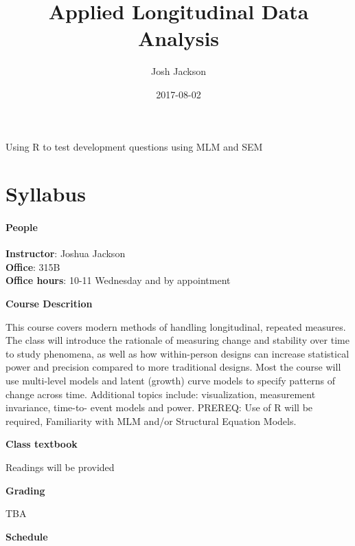 \documentclass[]{book}
\title{Applied Longitudinal Data Analysis}
\author{Josh Jackson}
\date{2017-08-02}
\begin{document}
\maketitle

{
\setcounter{tocdepth}{1}
\tableofcontents
}
\chapter*{}\label{section}

Using R to test development questions using MLM and SEM

\chapter{Syllabus}\label{syllabus}

\subsubsection{People}\label{people}

\textbf{Instructor}: Joshua Jackson\\
\textbf{Office}: 315B\\
\textbf{Office hours}: 10-11 Wednesday and by appointment

\textbf{Course Descrition}

This course covers modern methods of handling longitudinal, repeated
measures. The class will introduce the rationale of measuring change and
stability over time to study phenomena, as well as how within-person
designs can increase statistical power and precision compared to more
traditional designs. Most the course will use multi-level models and
latent (growth) curve models to specify patterns of change across time.
Additional topics include: visualization, measurement invariance,
time-to- event models and power. PREREQ: Use of R will be required,
Familiarity with MLM and/or Structural Equation Models.

\textbf{Class textbook}

Readings will be provided

\textbf{Grading}

TBA

\textbf{Schedule}
\end{document}
